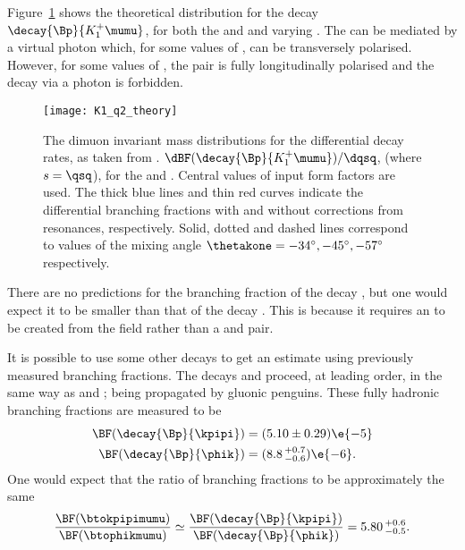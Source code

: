 Figure~\ref{fig:th:thetak1} shows the theoretical \qsq distribution for the decay
$\decay{\Bp}{K_1^+\mumu}$, for both the  and  and varying \thetakone.
The  can be mediated by a virtual photon which, for some values of \thetakone, can
be transversely polarised.
However, for some values of \thetakone, the \mumu pair is fully longitudinally polarised and the
decay via a photon is forbidden.

\begin{figure}
  \begin{center}
    \texttt{[image: K1\_q2\_theory]}
    \caption[Theoretical \qsq distribution for $\decay{\Bp}{K_1^+\mumu}$]
    {
      The dimuon invariant mass distributions for the differential decay rates, as taken from
      .
      $\dBF(\decay{\Bp}{K_1^+\mumu})/\dqsq$, (where $s=\qsq$), for the  and .
      Central values of input form factors are used.
      The thick blue lines and thin red curves indicate the differential branching fractions with
      and without corrections from resonances, respectively.
      Solid, dotted and dashed lines correspond to values of the mixing angle
      $\thetakone=-34^\circ,-45^\circ,-57^\circ$ respectively.
    }
    \label{fig:th:thetak1}
  \end{center}
\end{figure}

There are no predictions for the branching fraction of the decay \btophikmumu,
but one would expect it to be smaller than that of the decay \btokpipimumu.
This is because it requires an \ssbar to be created from the \QCD field rather than a \uubar and
\ddbar pair.

It is possible to use some other decays to get an estimate using previously measured branching
fractions.
The decays \decay{\Bp}{\kpipi} and \decay{\Bp}{\phik} proceed, at leading order, in the same way as
\btokpipimumu and \btophikmumu; being propagated by gluonic penguins.
These fully hadronic branching fractions are measured to be
\begin{align}
  \BF(\decay{\Bp}{\kpipi}) &= (5.10\pm0.29)\e{-5} \nonumber\\
  \BF(\decay{\Bp}{\phik}) &= (8.8\,^{+0.7}_{-0.6})\e{-6}.
\end{align}
One would expect that the ratio of branching fractions to be approximately the same
\begin{equation}
  \frac{\BF(\btokpipimumu)}{\BF(\btophikmumu)}
  \simeq
  \frac{\BF(\decay{\Bp}{\kpipi})}{\BF(\decay{\Bp}{\phik})}
  =
  5.80\,^{+0.6}_{-0.5}.
\end{equation}



